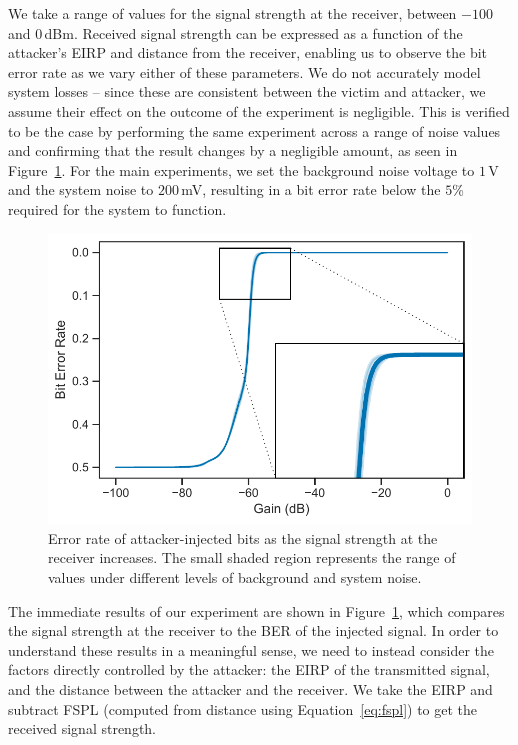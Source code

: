 We take a range of values for the signal strength at the receiver, between $-100$ and $0$\,dBm.
Received signal strength can be expressed as a function of the attacker's EIRP and distance from the receiver, enabling us to observe the bit error rate as we vary either of these parameters.
We do not accurately model system losses -- since these are consistent between the victim and attacker, we assume their effect on the outcome of the experiment is negligible.
This is verified to be the case by performing the same experiment across a range of noise values and confirming that the result changes by a negligible amount, as seen in Figure~\ref{fig:overshadowing_ber}.
For the main experiments, we set the background noise voltage to $1\,$\textmu V and the system noise to $200$\,mV, resulting in a bit error rate below the $5$\% required for the system to function.

\begin{figure}
    \centering
    \includegraphics[width=\columnwidth]{diagrams/overshadowing_ber_2.pdf}
    \caption{Error rate of attacker-injected bits as the signal strength at the receiver increases. The small shaded region represents the range of values under different levels of background and system noise.}
    \label{fig:overshadowing_ber}
\end{figure}

The immediate results of our experiment are shown in Figure~\ref{fig:overshadowing_ber}, which compares the signal strength at the receiver to the BER of the injected signal.
In order to understand these results in a meaningful sense, we need to instead consider the factors directly controlled by the attacker: the EIRP of the transmitted signal, and the distance between the attacker and the receiver.
We take the EIRP and subtract FSPL (computed from distance using Equation~\ref{eq:fspl}) to get the received signal strength.

